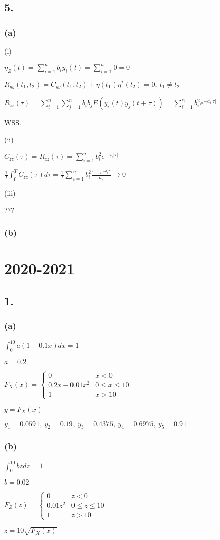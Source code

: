 \documentclass{article}
\begin{document}
\subsection*{5.}
\subsubsection*{(a)}
(i)\par
$\eta_{Z}(t)=\sum_{i=1}^{n} b_{i}y_{i}(t)=\sum_{i=1}^{n} 0=0$\par
$R_{yy}(t_{1},t_{2})=C_{yy}(t_{1},t_{2})+\eta(t_{1})\eta^{*}(t_{2})=0, \ t_{1}\neq t_{2}$\par
$R_{zz}(\tau)=\sum_{i=1}^{n}\sum_{j=1}^{n} b_{i}b_{j} E(y_{i}(t)y_{j}(t+\tau))=\sum_{i=1}^{n}b_{i}^{2}e^{-a_{i}|\tau|}$\par
WSS.\par
(ii)\par
$C_{zz}(\tau)=R_{zz}(\tau)=\sum_{i=1}^{n}b_{i}^{2}e^{-a_{i}|\tau|}$\par
$\frac{1}{T}\int_{0}^{T}C_{zz}(\tau)d\tau=\frac{1}{T}\sum_{i=1}^{n}b_{i}^{2}\frac{1-e^{-a_{i}T}}{a_{i}} \rightarrow 0$\par
(iii)\par
???
\subsubsection*{(b)}

\clearpage
\section*{2020-2021}
\subsection*{1.}
\subsubsection*{(a)}
$\int ^{10}_{0}a\left( 1-0.1x\right) dx=1$\par
$a=0.2$\par
$F_{X}(x)=\begin{cases}
0 &x<0\\
0.2x-0.01x^{2} &0 \leq x \leq 10\\
1 &x>10
\end{cases}$\par
$y=F_{X}(x)$\par
$y_{1}=0.0591, \ y_{2}=0.19, \ y_{3}=0.4375, \ y_{4}=0.6975, \ y_{5}=0.91$
\subsubsection*{(b)}
$\int ^{10}_{0}bzdz=1$\par
$b=0.02$\par
$F_{Z}(z)=\begin{cases}
0 &z<0\\
0.01z^{2} &0 \leq z \leq 10\\
1 &z>10
\end{cases}$\par
$z=10\sqrt{F_{X}(x)}$\par
\end{document}
